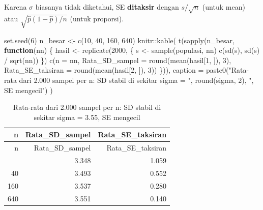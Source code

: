 \documentclass[
  indonesian,
  letterpaper,
]{book}
\newenvironment{Shaded}{\begin{snugshade}}{\end{snugshade}}
\newcommand{\AttributeTok}[1]{\textcolor[rgb]{0.40,0.45,0.13}{#1}}
\newcommand{\ControlFlowTok}[1]{\textcolor[rgb]{0.00,0.23,0.31}{\textbf{#1}}}
\newcommand{\DecValTok}[1]{\textcolor[rgb]{0.68,0.00,0.00}{#1}}
\newcommand{\FunctionTok}[1]{\textcolor[rgb]{0.28,0.35,0.67}{#1}}
\newcommand{\NormalTok}[1]{\textcolor[rgb]{0.00,0.23,0.31}{#1}}
\newcommand{\OtherTok}[1]{\textcolor[rgb]{0.00,0.23,0.31}{#1}}
\newcommand{\SpecialCharTok}[1]{\textcolor[rgb]{0.37,0.37,0.37}{#1}}
\newcommand{\StringTok}[1]{\textcolor[rgb]{0.13,0.47,0.30}{#1}}
\begin{document}
Karena \(\sigma\) biasanya tidak diketahui, SE \textbf{ditaksir} dengan
\(s/\sqrt{n}\) (untuk mean) atau \(\sqrt{\hat{p}(1-\hat{p})/n}\) (untuk
proporsi).

\begin{Shaded}
\begin{Highlighting}[]
\FunctionTok{set.seed}\NormalTok{(}\DecValTok{6}\NormalTok{)}
\NormalTok{n\_besar }\OtherTok{\textless{}{-}} \FunctionTok{c}\NormalTok{(}\DecValTok{10}\NormalTok{, }\DecValTok{40}\NormalTok{, }\DecValTok{160}\NormalTok{, }\DecValTok{640}\NormalTok{)}
\NormalTok{knitr}\SpecialCharTok{::}\FunctionTok{kable}\NormalTok{(}
  \FunctionTok{t}\NormalTok{(}\FunctionTok{sapply}\NormalTok{(n\_besar, }\ControlFlowTok{function}\NormalTok{(nn) \{}
\NormalTok{    hasil }\OtherTok{\textless{}{-}} \FunctionTok{replicate}\NormalTok{(}\DecValTok{2000}\NormalTok{, \{}
\NormalTok{      s }\OtherTok{\textless{}{-}} \FunctionTok{sample}\NormalTok{(populasi, nn)}
      \FunctionTok{c}\NormalTok{(}\FunctionTok{sd}\NormalTok{(s), }\FunctionTok{sd}\NormalTok{(s) }\SpecialCharTok{/} \FunctionTok{sqrt}\NormalTok{(nn))}
\NormalTok{    \})}
    \FunctionTok{c}\NormalTok{(}\AttributeTok{n =}\NormalTok{ nn,}
      \AttributeTok{Rata\_SD\_sampel   =} \FunctionTok{round}\NormalTok{(}\FunctionTok{mean}\NormalTok{(hasil[}\DecValTok{1}\NormalTok{, ]), }\DecValTok{3}\NormalTok{),}
      \AttributeTok{Rata\_SE\_taksiran =} \FunctionTok{round}\NormalTok{(}\FunctionTok{mean}\NormalTok{(hasil[}\DecValTok{2}\NormalTok{, ]), }\DecValTok{3}\NormalTok{))}
\NormalTok{  \})),}
  \AttributeTok{caption =} \FunctionTok{paste0}\NormalTok{(}\StringTok{"Rata{-}rata dari 2.000 sampel per n: SD stabil di sekitar sigma = "}\NormalTok{,}
                   \FunctionTok{round}\NormalTok{(sigma, }\DecValTok{2}\NormalTok{), }\StringTok{", SE mengecil"}\NormalTok{)}
\NormalTok{)}
\end{Highlighting}
\end{Shaded}

\begin{longtable}[]{@{}rrr@{}}
\caption{Rata-rata dari 2.000 sampel per n: SD stabil di sekitar sigma =
3.55, SE mengecil}\tabularnewline
\toprule\noalign{}
n & Rata\_SD\_sampel & Rata\_SE\_taksiran \\
\midrule\noalign{}
\endfirsthead
\toprule\noalign{}
n & Rata\_SD\_sampel & Rata\_SE\_taksiran \\
\midrule\noalign{}
\endhead
\bottomrule\noalign{}
\endlastfoot
10 & 3.348 & 1.059 \\
40 & 3.493 & 0.552 \\
160 & 3.537 & 0.280 \\
640 & 3.551 & 0.140 \\
\end{longtable}
\end{document}
